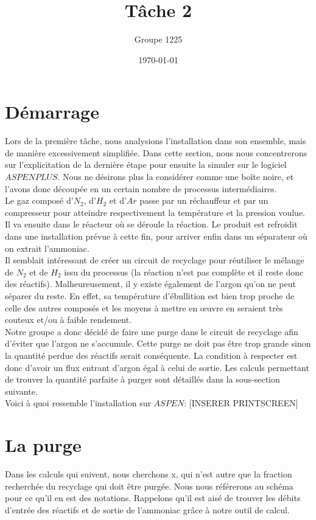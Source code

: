\documentclass[a4paper, oneside, 12pt]{article}
\title{Tâche 2}
\author{Groupe 1225}
\date{\today}
\begin{document}
\maketitle

\section{Démarrage}

Lors de la première tâche, nous analysions l'installation dans son ensemble, mais de manière excessivement simplifiée. Dans cette section, nous nous concentrerons sur l'explicitation de la dernière étape pour ensuite la simuler sur le logiciel $ASPEN PLUS$. Nous ne désirons plus la considérer comme une boîte noire, et l'avons donc découpée en un certain nombre de processus intermédiaires.\\
Le gaz composé d'$N_2$, d'$H_2$ et d'$Ar$ passe par un réchauffeur et par un compresseur pour atteindre respectivement la température et la pression voulue. Il va ensuite dans le réacteur où se déroule la réaction. Le produit est refroidit dans une installation prévue à cette fin, pour arriver enfin dans un séparateur où on extrait l'ammoniac.\\
Il semblait intéressant de créer un circuit de recyclage pour réutiliser le mélange de $N_2$ et de $H_2$ issu du processus (la réaction n'est pas complète et il reste donc des réactifs). Malheureusement, il y existe également de l'argon qu'on ne peut séparer du reste. En effet, sa température d'ébullition est bien trop proche de celle des autres composés et les moyens à mettre en œuvre en seraient très couteux et/ou à faible rendement. \\
Notre groupe a donc décidé de faire une purge dans le circuit de recyclage afin d'éviter que l'argon ne s'accumule. Cette purge ne doit pas être trop grande sinon la quantité perdue des réactifs serait conséquente. La condition à respecter est donc d'avoir un flux entrant d'argon égal à celui de sortie. Les calculs permettant de trouver la quantité parfaite à purger sont détaillés dans la sous-section suivante.\\
Voici à quoi ressemble l'installation sur $ASPEN$:
[INSERER PRINTSCREEN]

\section{La purge}

Dans les calculs qui suivent, nous cherchons x, qui n'est autre que la fraction recherchée du recyclage qui doit être purgée. Nous nous référerons au schéma pour ce qu'il en est des notations. Rappelons qu'il est aisé de trouver les débits d'entrée des réactifs et de sortie de l'ammoniac grâce à notre outil de calcul.\\
\end{document}
